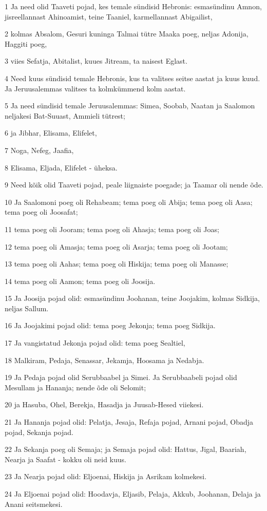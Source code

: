 \par 1 Ja need olid Taaveti pojad, kes temale sündisid Hebronis: esmasündinu Amnon, jisreellannast Ahinoamist, teine Taaniel, karmellannast Abigailist,
\par 2 kolmas Absalom, Gesuri kuninga Talmai tütre Maaka poeg, neljas Adonija, Haggiti poeg,
\par 3 viies Sefatja, Abitalist, kuues Jitream, ta naisest Eglast.
\par 4 Need kuus sündisid temale Hebronis, kus ta valitses seitse aastat ja kuus kuud. Ja Jeruusalemmas valitses ta kolmkümmend kolm aastat.
\par 5 Ja need sündisid temale Jeruusalemmas: Simea, Soobab, Naatan ja Saalomon neljakesi Bat-Suuast, Ammieli tütrest;
\par 6 ja Jibhar, Elisama, Elifelet,
\par 7 Noga, Nefeg, Jaafia,
\par 8 Elisama, Eljada, Elifelet - üheksa.
\par 9 Need kõik olid Taaveti pojad, peale liignaiste poegade; ja Taamar oli nende õde.
\par 10 Ja Saalomoni poeg oli Rehabeam; tema poeg oli Abija; tema poeg oli Aasa; tema poeg oli Joosafat;
\par 11 tema poeg oli Jooram; tema poeg oli Ahasja; tema poeg oli Joas;
\par 12 tema poeg oli Amasja; tema poeg oli Asarja; tema poeg oli Jootam;
\par 13 tema poeg oli Aahas; tema poeg oli Hiskija; tema poeg oli Manasse;
\par 14 tema poeg oli Aamon; tema poeg oli Joosija.
\par 15 Ja Joosija pojad olid: esmasündinu Joohanan, teine Joojakim, kolmas Sidkija, neljas Sallum.
\par 16 Ja Joojakimi pojad olid: tema poeg Jekonja; tema poeg Sidkija.
\par 17 Ja vangistatud Jekonja pojad olid: tema poeg Sealtiel,
\par 18 Malkiram, Pedaja, Senassar, Jekamja, Hoosama ja Nedabja.
\par 19 Ja Pedaja pojad olid Serubbaabel ja Simei. Ja Serubbaabeli pojad olid Mesullam ja Hananja; nende õde oli Selomit;
\par 20 ja Hasuba, Ohel, Berekja, Hasadja ja Juusab-Hesed viiekesi.
\par 21 Ja Hananja pojad olid: Pelatja, Jesaja, Refaja pojad, Arnani pojad, Obadja pojad, Sekanja pojad.
\par 22 Ja Sekanja poeg oli Semaja; ja Semaja pojad olid: Hattus, Jigal, Baariah, Nearja ja Saafat - kokku oli neid kuus.
\par 23 Ja Nearja pojad olid: Eljoenai, Hiskija ja Asrikam kolmekesi.
\par 24 Ja Eljoenai pojad olid: Hoodavja, Eljasib, Pelaja, Akkub, Joohanan, Delaja ja Anani seitsmekesi.

